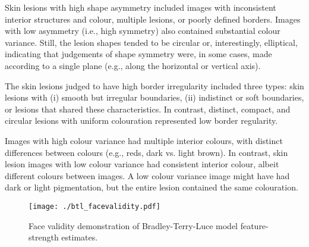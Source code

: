 \documentclass[
    man, 12pt, a4paper,
    donotrepeattitle, floatsintext, draftfirst
]{apa7}
\begin{document}
Skin lesions with high shape asymmetry included images with inconsistent interior structures and colour, multiple lesions, or poorly defined borders.
Images with low asymmetry (i.e., high symmetry) also contained substantial colour variance. Still, the lesion shapes tended to be circular or, interestingly, elliptical, indicating that judgements of shape symmetry were, in some cases, made according to a single plane (e.g., along the horizontal or vertical axis).

The skin lesions judged to have high border irregularity included three types: skin lesions with (i) smooth but irregular boundaries, (ii) indistinct or soft boundaries, or lesions that shared these characteristics.
In contrast, distinct, compact, and circular lesions with uniform colouration represented low border regularity.

Images with high colour variance had multiple interior colours, with distinct differences between colours (e.g., reds, dark vs. light brown). In contrast, skin lesion images with low colour variance had consistent interior colour, albeit different colours between images. A low colour variance image might have had dark or light pigmentation, but the entire lesion contained the same colouration.

\begin{figure}[tbh]
    \caption{Face validity demonstration of Bradley-Terry-Luce model feature-strength estimates.}
    \label{fig:btl_fv}
    \texttt{[image: ./btl\_facevalidity.pdf]}
\end{figure}
\end{document}
